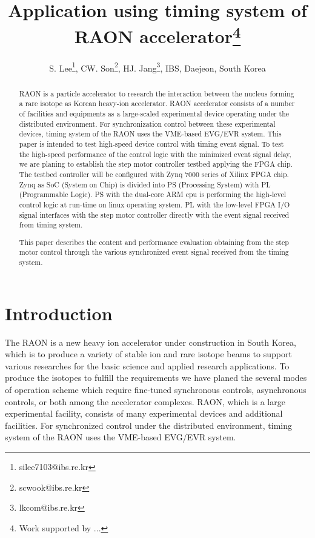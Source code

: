 \documentclass[a4paper,
              ]{jacow}
\begin{document}
\title{Application using timing system of RAON accelerator\thanks{Work supported by ...}}

\author{S. Lee\thanks{silee7103@ibs.re.kr}, CW. Son\thanks{scwook@ibs.re.kr}, HJ. Jang\thanks{lkcom@ibs.re.kr}, IBS, Daejeon, South Korea\\
       }
\maketitle

%
\begin{abstract}
   RAON is a particle accelerator to research the interaction between the nucleus forming a rare isotope as Korean heavy-ion accelerator. RAON accelerator consists of a number of facilities and equipments as a large-scaled experimental device operating under the distributed environment. For synchronization control between these experimental devices, timing system of the RAON uses the VME-based EVG/EVR system. This paper is intended to test high-speed device control with timing event signal. To test the high-speed performance of the control logic with the minimized event signal delay, we are planing to establish the step motor controller testbed applying the FPGA chip. The testbed controller will be configured with Zynq 7000 series of Xilinx FPGA chip. Zynq as SoC (System on Chip) is divided into PS (Processing System) with PL (Programmable Logic). PS with the dual-core ARM cpu is performing the high-level control logic at run-time on linux operating system. PL with the low-level FPGA I/O signal interfaces with the step motor controller directly with the event signal received from timing system.
   
   This paper describes the content and performance evaluation obtaining from the step motor control through the various synchronized event signal received from the timing system.
\end{abstract}


\section{Introduction}
The RAON is a new heavy ion accelerator under construction in South Korea, which is to produce a variety of stable ion and rare isotope beams to support various researches for the basic science and applied research applications\cite{TSHOO:NIMB}. To produce the isotopes to fulfill the requirements we have planed the several modes of operation scheme which require fine-tuned synchronous controls, asynchronous controls, or both among the accelerator complexes. RAON, which is a large experimental facility, consists of many experimental devices and additional facilities. For synchronized control under the distributed environment, timing system of the RAON uses the VME-based EVG/EVR system.
\end{document}
